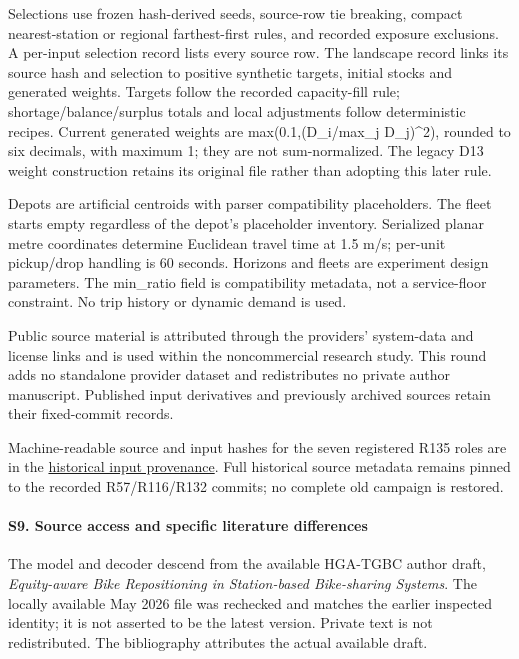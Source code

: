\documentclass[
  american,
  11pt,
]{article}
\begin{document}
Selections use frozen hash-derived seeds, source-row tie breaking,
compact nearest-station or regional farthest-first rules, and recorded
exposure exclusions. A per-input selection record lists every source
row. The landscape record links its source hash and selection to
positive synthetic targets, initial stocks and generated weights.
Targets follow the recorded capacity-fill rule; shortage/balance/surplus
totals and local adjustments follow deterministic recipes. Current
generated weights are max(0.1,(D\_\allowbreak{}i/max\_\allowbreak{}j D\_\allowbreak{}j)\^{}2), rounded to six
decimals, with maximum 1; they are not sum-normalized. The legacy D13
weight construction retains its original file rather than adopting this
later rule.

Depots are artificial centroids with parser compatibility placeholders.
The fleet starts empty regardless of the depot's placeholder inventory.
Serialized planar metre coordinates determine Euclidean travel time at
1.5 m/s; per-unit pickup/drop handling is 60 seconds. Horizons and
fleets are experiment design parameters. The min\_\allowbreak{}ratio field is
compatibility metadata, not a service-floor constraint. No trip history
or dynamic demand is used.

Public source material is attributed through the providers' system-data
and license links and is used within the noncommercial research study.
This round adds no standalone provider dataset and redistributes no
private author manuscript. Published input derivatives and previously
archived sources retain their fixed-commit records.

Machine-readable source and input hashes for the seven registered R135
roles are in the
\href{https://github.com/yifanXovo/TailoredExact/blob/codex/round172-journal-manuscript/results/unified_exact_round135/input_provenance.json}{historical
input provenance}. Full historical source metadata remains pinned to the
recorded R57/R116/R132 commits; no complete old campaign is restored.

\paragraph{S9. Source access and specific literature
differences}\label{s9.-source-access-and-specific-literature-differences}

The model and decoder descend from the available HGA-TGBC author draft,
\emph{Equity-aware Bike Repositioning in Station-based Bike-sharing
Systems}. The locally available May 2026 file was rechecked and matches
the earlier inspected identity; it is not asserted to be the latest
version. Private text is not redistributed. The bibliography attributes
the actual available draft.
\end{document}
